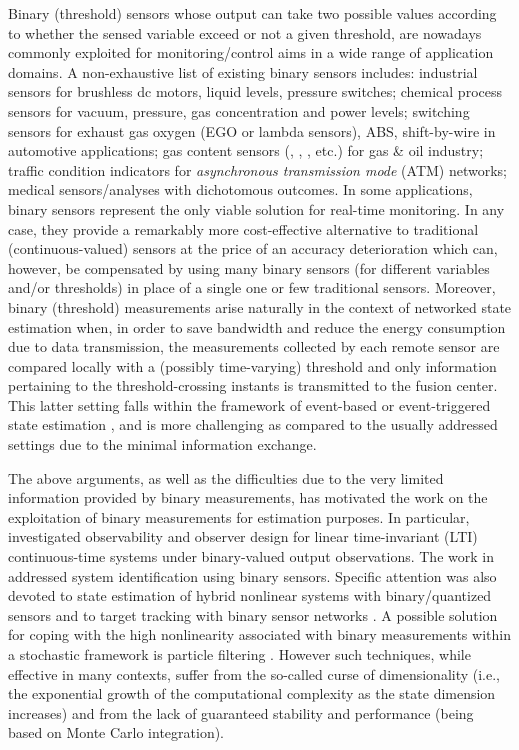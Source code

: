 \documentclass[11pt,journal,onecolumn]{IEEEtran}
\begin{document}
Binary (threshold) sensors whose output can take two possible values according to whether the sensed variable exceed or not a given threshold, are nowadays commonly exploited for monitoring/control aims in a wide range of application domains. A non-exhaustive list of existing binary sensors includes: industrial sensors for brushless dc motors, liquid levels, pressure switches; chemical process sensors for vacuum, pressure, gas concentration and power levels; switching sensors for exhaust gas oxygen (EGO or lambda sensors), ABS, shift-by-wire in automotive applications; gas content sensors (, , , etc.) for gas \& oil industry; traffic condition indicators for \textit{asynchronous transmission mode} (ATM) networks; medical sensors/analyses with dichotomous outcomes. In some applications, binary sensors represent the only viable solution for real-time monitoring. In any case, they provide a remarkably more cost-effective alternative to traditional (continuous-valued) sensors at the price of an accuracy deterioration which can, however, be compensated by using many binary sensors (for different variables and/or thresholds) in place of a single one or few traditional sensors. Moreover, binary (threshold) measurements arise naturally in the context of networked state estimation when, in order to save bandwidth and reduce the energy consumption due to data transmission, the measurements collected by each remote sensor are compared locally with a (possibly time-varying) threshold and only information pertaining to the threshold-crossing instants is transmitted to the fusion center. This latter setting falls within the framework of event-based or event-triggered state estimation \cite{BaBeCh,Lazar,likelihood}, and is more challenging as compared to the usually addressed settings due to the minimal information exchange.

The above arguments, as well as the difficulties due to the very limited information provided by binary measurements, has motivated the work on the exploitation of binary measurements for estimation purposes. In particular, \cite{state_reconstruction,Irr-sampling} investigated observability and observer design for linear time-invariant (LTI) continuous-time systems under binary-valued output observations. The work in \cite{Wang1,Wang2} addressed system identification using binary sensors. Specific attention was also devoted to state estimation of hybrid nonlinear systems with binary/quantized sensors \cite{Koutsoukos} and to target tracking with binary sensor networks \cite{Aslam}. A possible solution for coping with the high nonlinearity associated with binary measurements within a stochastic framework is particle filtering \cite{Djuric_2,Ristic}. However such techniques, while effective in many contexts, suffer from the so-called curse of dimensionality (i.e., the exponential growth of the computational complexity as the state dimension increases) and from the lack of guaranteed stability and performance (being based on Monte Carlo integration).
\end{document}
